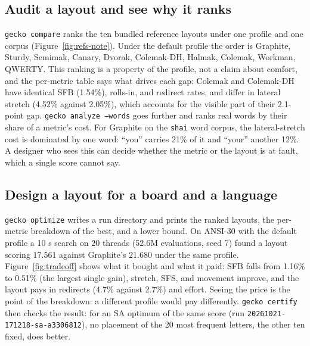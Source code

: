 \documentclass{gecko-paper}
\begin{document}
\begin{paperbody}
\subsection{Audit a layout and see why it ranks}
\texttt{gecko compare} ranks the ten bundled reference layouts under one profile and one corpus (Figure~\ref{fig:refs-note}). Under the default profile the order is Graphite, Sturdy, Semimak, Canary, Dvorak, Colemak-DH, Halmak, Colemak, Workman, QWERTY. This ranking is a property of the profile, not a claim about comfort, and the per-metric table says what drives each gap: Colemak and Colemak-DH have identical SFB (1.54\%), rolls-in, and redirect rates, and differ in lateral stretch (4.52\% against 2.05\%), which accounts for the visible part of their 2.1-point gap. \texttt{gecko analyze --words} goes further and ranks real words by their share of a metric's cost. For Graphite on the \texttt{shai} word corpus, the lateral-stretch cost is dominated by one word: ``you'' carries 21\% of it and ``your'' another 12\%. A designer who sees this can decide whether the metric or the layout is at fault, which a single score cannot say.


\subsection{Design a layout for a board and a language}
\texttt{gecko optimize} writes a run directory and prints the ranked layouts, the per-metric breakdown of the best, and a lower bound. On ANSI-30 with the default profile a 10 s search on 20 threads (52.6M evaluations, seed 7) found a layout scoring 17.561 against Graphite's 21.680 under the same profile. Figure~\ref{fig:tradeoff} shows what it bought and what it paid: SFB falls from 1.16\% to 0.51\% (the largest single gain), stretch, SFS, and movement improve, and the layout pays in redirects (4.7\% against 2.7\%) and effort. Seeing the price is the point of the breakdown: a different profile would pay differently. \texttt{gecko certify} then checks the result: for an SA optimum of the same score (run \texttt{20261021-171218-sa-a3306812}), no placement of the 20 most frequent letters, the other ten fixed, does better.



\end{paperbody}
\end{document}
